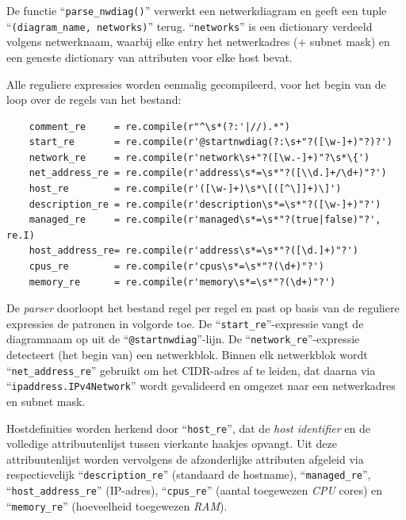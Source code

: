 De functie ``\texttt{parse\_nwdiag()}'' verwerkt een netwerkdiagram en geeft een tuple ``\texttt{(diagram\_name, networks)}'' terug. ``\texttt{networks}'' is een dictionary verdeeld volgens netwerknaam, waarbij elke entry het netwerkadres (+ subnet mask) en een geneste dictionary van attributen voor elke host bevat.

Alle reguliere expressies worden eenmalig gecompileerd, voor het begin van de loop over de regels van het bestand:

\begin{codeblockfixed}
  \begin{codeblock}
    \begin{verbatim}
    comment_re     = re.compile(r"^\s*(?:'|//).*")
    start_re       = re.compile(r'@startnwdiag(?:\s+"?([\w-]+)"?)?')
    network_re     = re.compile(r'network\s+"?([\w.-]+)"?\s*\{')
    net_address_re = re.compile(r'address\s*=\s*"?([\\d.]+/\d+)"?')
    host_re        = re.compile(r'([\w-]+)\s*\[([^\]]+)\]')
    description_re = re.compile(r'description\s*=\s*"?([\w-]+)"?')
    managed_re     = re.compile(r'managed\s*=\s*"?(true|false)"?', re.I)
    host_address_re= re.compile(r'address\s*=\s*"?([\d.]+)"?')
    cpus_re        = re.compile(r'cpus\s*=\s*"?(\d+)"?')
    memory_re      = re.compile(r'memory\s*=\s*"?(\d+)"?')
\end{verbatim}
    \caption[Reguliere expressies voor ``\texttt{parse\_nwdiag()}'']{Reguliere expressies voor de parsering van het netwerkdiagram.}
    \label{code:regex_nwdiag}
  \end{codeblock}
\end{codeblockfixed}

De \emph{parser} doorloopt het bestand regel per regel en past op basis van de reguliere expressies de patronen in volgorde toe.
De ``\texttt{start\_re}''-expressie vangt de diagramnaam op uit de ``\texttt{@startnwdiag}''-lijn.
De ``\texttt{network\_re}''-expressie detecteert (het begin van) een netwerkblok. Binnen elk netwerkblok wordt ``\texttt{net\_address\_re}'' gebruikt om het CIDR-adres af te leiden, dat daarna via ``\texttt{ipaddress.IPv4Network}'' wordt gevalideerd en omgezet naar een netwerkadres en subnet mask.

Hostdefinities worden herkend door ``\texttt{host\_re}'', dat de \emph{host identifier} en de volledige attribuutenlijst tussen vierkante haakjes opvangt. Uit deze attribuutenlijst worden vervolgens de afzonderlijke attributen afgeleid via respectievelijk ``\texttt{description\_re}'' (standaard de hostname), ``\texttt{managed\_re}'', ``\texttt{host\_address\_re}'' (IP-adres), ``\texttt{cpus\_re}'' (aantal toegewezen \emph{CPU} cores) en ``\texttt{memory\_re}'' (hoeveelheid toegewezen \emph{RAM}).

